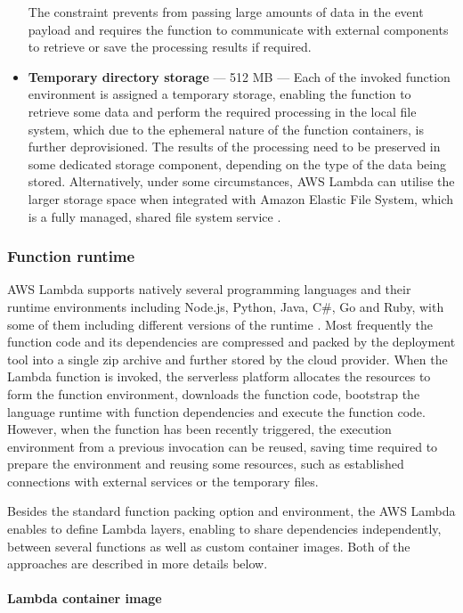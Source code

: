 \begin{itemize}
   The constraint prevents from passing large amounts of data in the event payload and requires the function to communicate with external components to retrieve or save the processing results if required.
   \item \textbf{Temporary directory storage} --- 512 MB --- Each of the invoked function environment is assigned a temporary storage, enabling the function to retrieve some data and perform the required processing in the local file system, which due to the ephemeral nature of the function containers, is further deprovisioned. The results of the processing need to be preserved in some dedicated storage component, depending on the type of the data being stored. Alternatively, under some circumstances, AWS Lambda can utilise the larger storage space when integrated with Amazon Elastic File System, which is a fully managed, shared file system service \cite{AWSLambdaEFS}.
\end{itemize}

\subsubsection{Function runtime} \label{chapter:lambda-custom-runtimes}

AWS Lambda supports natively several programming languages and their runtime environments including Node.js, Python, Java, C\#, Go and Ruby, with some of them including different versions of the runtime \cite{AWSLambdaRuntimes}. Most frequently the function code and its dependencies are compressed and packed by the deployment tool into a single zip archive and further stored by the cloud provider. When the Lambda function is invoked, the serverless platform allocates the resources to form the function environment, downloads the function code, bootstrap the language runtime with function dependencies and execute the function code. However, when the function has been recently triggered, the execution environment from a previous invocation can be reused, saving time required to prepare the environment and reusing some resources, such as established connections with external services or the temporary files.

Besides the standard function packing option and environment, the AWS Lambda enables to define Lambda layers, enabling to share dependencies independently, between several functions as well as custom container images.
Both of the approaches are described in more details below.

\paragraph{Lambda container image}

